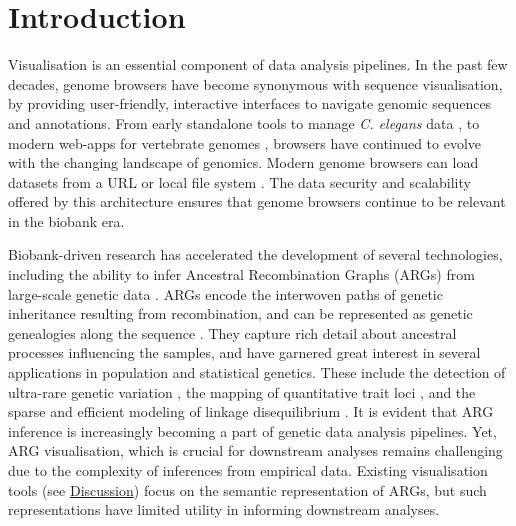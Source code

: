 \documentclass[unnumsec,webpdf,contemporary,large,namedate]{oup-authoring-template}%
\begin{document}
 \maketitle \section{Introduction} Visualisation
is an essential component of data analysis pipelines. In the past few decades,
genome browsers have become synonymous with sequence visualisation, by
providing user-friendly, interactive interfaces to navigate genomic sequences
and annotations. From early standalone tools to manage \textit{C. elegans} data
\citep{Eeckman1995}, to modern web-apps for vertebrate genomes
\citep{Birney2004,Rangwala2024,Nassar2023}, browsers have continued to evolve
with the changing landscape of genomics. Modern genome browsers can load
datasets from a URL or local file system \citep{IGV-web,Lee2013,Robinson2023}.
The data security and scalability offered by this architecture ensures that
genome browsers continue to be relevant in the biobank era.

Biobank-driven research has accelerated the development of several
technologies, including the ability to infer Ancestral Recombination Graphs
(ARGs) from large-scale genetic data
\citep{Kelleher2019,Speidel2019,Zhang2023,Gunnarsson2024.08.31.610248,Deng2024.03.16.585351}.
ARGs encode the interwoven paths of genetic inheritance resulting from
recombination, and can be represented as genetic genealogies along the sequence
\citep{Wong2024,Hudson1983,Griffiths1997}. They capture rich detail about
ancestral processes influencing the samples, and have garnered great interest
in several applications in population and statistical genetics. These include
the detection of ultra-rare genetic variation \citep{Zhang2023}, the mapping of
quantitative trait loci \citep{Link2023}, and the sparse and efficient modeling
of linkage disequilibrium \citep{Nowbandegani2023}. It is evident that ARG
inference is increasingly becoming a part of genetic data analysis pipelines.
Yet, ARG visualisation, which is crucial for downstream analyses remains
challenging due to the complexity of inferences from empirical data. Existing
visualisation tools (see \hyperref[sec:Discussion]{Discussion}) focus on the
semantic representation of ARGs, but such representations have limited utility
in informing downstream analyses. 
\end{document}
